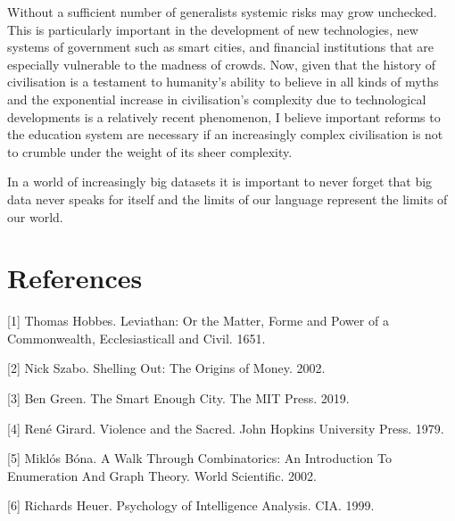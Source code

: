 \documentclass{article}
\begin{document}
Without a sufficient number of generalists systemic risks may grow unchecked. This is particularly important in the
development of new technologies, new systems of government such as smart cities, and financial
institutions that are especially vulnerable to the madness of crowds. Now, given that the history of civilisation is a testament to humanity's ability to believe in all
kinds of myths and the exponential increase in civilisation's complexity due to technological
developments is a relatively recent phenomenon, I believe important reforms to the education
system are necessary if an increasingly complex civilisation is not to crumble under the
weight of its sheer complexity. 

In a world of increasingly big datasets it is important to never forget that big data never speaks for itself and the limits of our language represent the limits of our world. 

\section*{References}

\small

[1] Thomas Hobbes. Leviathan: Or the Matter, Forme and Power of a Commonwealth, Ecclesiasticall and Civil. 1651.

[2] Nick Szabo. Shelling Out: The Origins of Money. 2002.

[3] Ben Green. The Smart Enough City. The MIT Press. 2019.

[4] René Girard. Violence and the Sacred. John Hopkins University Press. 1979.

[5] Miklós Bóna. A Walk Through Combinatorics: An Introduction To Enumeration And Graph Theory. World Scientific. 2002.   

[6] Richards Heuer. Psychology of Intelligence Analysis. CIA. 1999.
\end{document}
